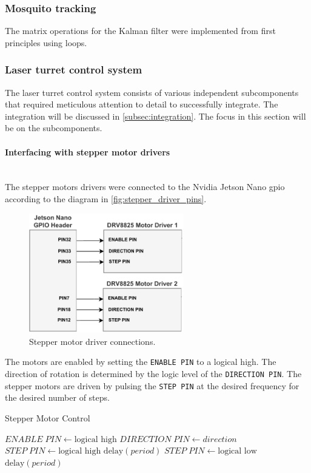\subsubsection{Mosquito tracking}
The matrix operations for the Kalman filter were implemented from first principles using loops.


\subsubsection{Laser turret control system}
The laser turret control system consists of various independent subcomponents that required meticulous attention to detail to successfully integrate. The integration will be discussed in \autoref{subsec:integration}. The focus in this section will be on the subcomponents.


\paragraph{Interfacing with stepper motor drivers}\mbox{}\\
The stepper motors drivers were connected to the Nvidia Jetson Nano \gls{gpio} according to the diagram in \autoref{fig:stepper_driver_pins}.
\begin{figure}[h]
  \centering
  \includegraphics[width=0.6\textwidth]{figures/stepper_driver_pins.pdf}
  \caption{Stepper motor driver connections.}
  \label{fig:stepper_driver_pins}
\end{figure}
The motors are enabled by setting the \texttt{ENABLE PIN} to a logical high. The direction of rotation is determined by the logic level of the \texttt{DIRECTION PIN}. The stepper motors are driven by pulsing the \texttt{STEP PIN} at the desired frequency for the desired number of steps.
\begin{algorithm}[h]
  \caption{Stepper Motor Control}
  \label{alg:stepper_control}
  \begin{algorithmic}[1]
    \State $ENABLE\;PIN \gets \text{logical high}$
    \State $DIRECTION\;PIN \gets direction$
    \State $STEP\;PIN \gets \text{logical high}$
    \State $\text{delay}(period)$
    \State $STEP\;PIN \gets \text{logical low}$
    \State $\text{delay}(period)$
    \EndFor
  \end{algorithmic}
\end{algorithm}


